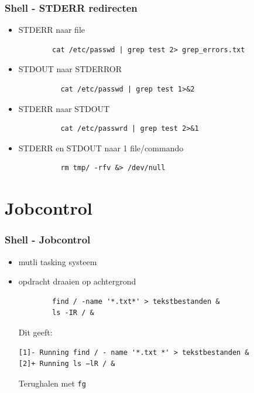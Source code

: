 \documentclass{beamer}
\begin{document}
\begin{frame}[fragile]
  \frametitle{Shell - STDERR redirecten}
  \begin{itemize}
    \item<1-> STDERR naar file
      \begin{lstlisting}
        cat /etc/passwd | grep test 2> grep_errors.txt
      \end{lstlisting}
      \item<2-> STDOUT naar STDERROR
        \begin{lstlisting}
          cat /etc/passwd | grep test 1>&2
        \end{lstlisting}
      \item<3-> STDERR naar STDOUT
        \begin{lstlisting}
          cat /etc/passwrd | grep test 2>&1
        \end{lstlisting}
      \item<4-> STDERR en STDOUT naar 1 file/commando
        \begin{lstlisting}
          rm tmp/ -rfv &> /dev/null
        \end{lstlisting}
  \end{itemize}
\end{frame}

\section{Jobcontrol}
\begin{frame}[fragile]
  \frametitle{Shell - Jobcontrol}
  \begin{itemize}
    \item<1-> mutli tasking systeem
    \item<2-> opdracht draaien op achtergrond
      \begin{lstlisting}
        find / -name '*.txt*' > tekstbestanden &
        ls -IR / &
      \end{lstlisting}
      Dit geeft:
      \begin{lstlisting}
[1]- Running find / - name '*.txt *' > tekstbestanden &
[2]+ Running ls −lR / &        
      \end{lstlisting}
      Terughalen met \texttt{fg}
  \end{itemize}
\end{frame}
\end{document}
